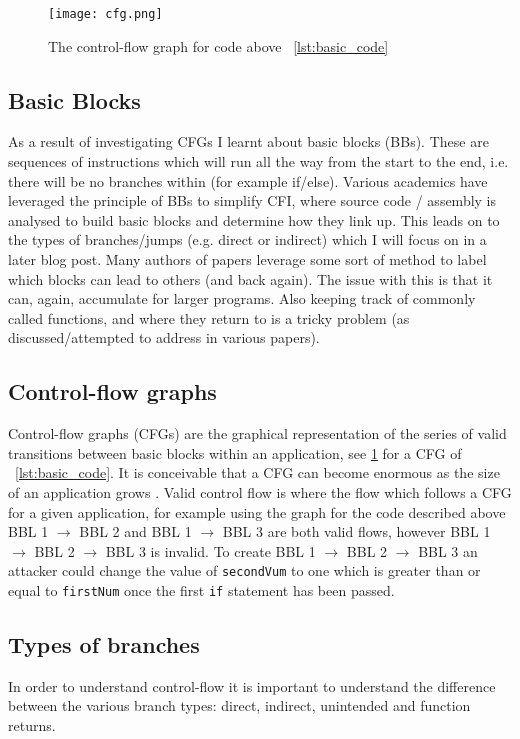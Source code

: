 \begin{figure}
  \texttt{[image: cfg.png]}
  \caption{The control-flow graph for code above ~\ref{lst:basic_code}}
  \label{fig:basicCFG}
\end{figure}

\subsection{Basic Blocks}
As a result of investigating CFGs I learnt about basic blocks (BBs). These are sequences of instructions which will run all the way from the start to the end, i.e. there will be no branches within (for example if/else). Various academics have leveraged the principle of BBs to simplify CFI, where source code / assembly is analysed to build basic blocks and determine how they link up. This leads on to the types of branches/jumps (e.g. direct or indirect) which I will focus on in a later blog post. Many authors of papers leverage some sort of method to label which blocks can lead to others (and back again). The issue with this is that it can, again, accumulate for larger programs. Also keeping track of commonly called functions, and where they return to is a tricky problem (as discussed/attempted to address in various papers).

\subsection{Control-flow graphs}
Control-flow graphs (CFGs) are the graphical representation of the series of valid transitions between basic blocks within an application, see \ref{fig:basicCFG} for a CFG of ~\ref{lst:basic_code}. It is conceivable that a CFG can become enormous as the size of an application grows . Valid control flow is where the flow which follows a CFG for a given application, for example using the graph for the code described above BBL 1 $\rightarrow$ BBL 2 and BBL 1 $\rightarrow$ BBL 3 are both valid flows, however BBL 1 $\rightarrow$ BBL 2 $\rightarrow$ BBL 3 is invalid. To create BBL 1 $\rightarrow$ BBL 2 $\rightarrow$ BBL 3 an attacker could change the value of \verb|secondVum| to one which is greater than or equal to \verb|firstNum| once the first \verb|if| statement has been passed. 

\subsection{Types of branches}
In order to understand control-flow it is important to understand the difference between the various branch types: direct, indirect, unintended and function returns.

